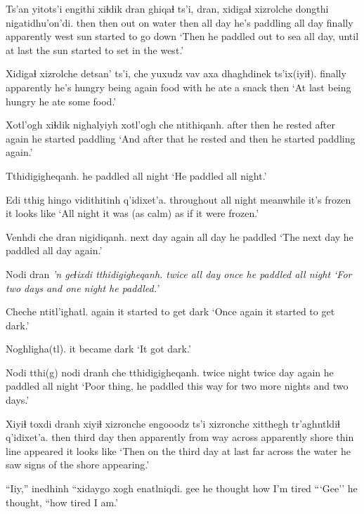 \documentclass[12pt]{article}
\begin{document}
\gll Ts'an yitots'i engithi xiɬdik dran ghiqaɬ ts'i, dran, xidigaɬ xizrolche dongthi nigatidhu'on'di. 
then  then       {out on water} then  {all day} {he's paddling} {} {all day} finally apparently west {sun started to go down}
\glt `Then he paddled out to sea all day, until at last the sun started to set in the west.' 
\glend

\gll Xidigaɬ xizrolche detsan' ts'i, che yuxudz vav axa dhaghdinek ts'ix(iyiɬ). 
finally apparently {he's hungry} being again {} food with {he ate a snack} then
\glt `At last being hungry he ate some food.' 
\glend

\gll Xotl'ogh xiɬdik nighalyiyh xotl'ogh che ntithiqanh.
after then {he rested} after again {he started paddling} 
\glt `And after that he rested and then he started paddling again.' 
\glend

\gll Tthidigigheqanh. 
{{he paddled all night}}
\glt `He paddled all night.'
\glend

\gll Edi tthig hingo vidithitinh q'idixet'a. 
throughout {all night} meanwhile {it's frozen} {it looks like}
\glt `All night it was (as calm) as if it were frozen.' 
\glend

\gll Venhdi che dran nigidiqanh. 
{next day} again {all day} {he paddled}
\glt `The next day he paddled all day again.' 
\glend

\gll Nodi dran \em{'n} geɬixdi tthidigigheqanh. 
twice {all day} {} once {he paddled all night}
\glt `For two days and one night he paddled.' 
\glend

\gll Cheche ntitl'ighatl.
again {it started to get dark} 
\glt `Once again it started to get dark.' 
\glend

\gll Noghligha(tl).
{{it became dark}}
\glt  `It got dark.'
\glend

\gll Nodi tthi(g) nodi dranh che tthidigigheqanh. 
twice night twice day again {he paddled all night}
\glt `Poor thing, he paddled this way for two more nights and two days.' 
\glend

\gll Xiyiɬ toxdi dranh xiyiɬ xizronche {engooodz ts'i} xizronche xitthegh tr'aghntldiɬ q'idixet'a.
then  third day then apparently {from way across} apparently shore    {thin line appeared} {it looks like} 
\glt `Then on the third day at last far across the water he saw signs of the shore appearing.' 
\glend

\gll ``Iiy,'' inedhinh {``xidaygo} {xogh enatlniqdi.}
gee    {he thought} how {I'm tired}
\glt ```Gee'' he thought, ``how tired I am.'
\glend
\end{document}
